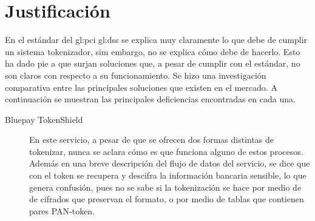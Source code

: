 \section{Justificación}


En el estándar del \gls{gl:pci} \gls{gl:dss} se explica muy claramente lo que
debe de cumplir un sistema tokenizador, sim embargo, no se explica cómo debe de
hacerlo. Esto ha dado pie a que surjan soluciones que, a pesar de cumplir con
el estándar, no son claros con respecto a su funcionamiento. Se hizo una
investigación comparativa entre las principales soluciones que existen en el
mercado. A continuación se muestran las principales deficiencias encontradas
en cada una.

\begin{description}

  \item[Bluepay TokenShield]
    En este servicio, a pesar de que se ofrecen dos formas distintas de
    tokenizar, nunca se aclara cómo es que funciona alguno de estos procesos.
    Además en una breve descripción del flujo de datos del servicio, se dice
    que con el token se recupera y descifra la información bancaria sensible,
    lo que genera confusión, pues no se sabe si la tokenización se hace por
    medio de de cifrados que preservan el formato, o por medio de tablas que
    contienen pares PAN-token.

\end{description}







